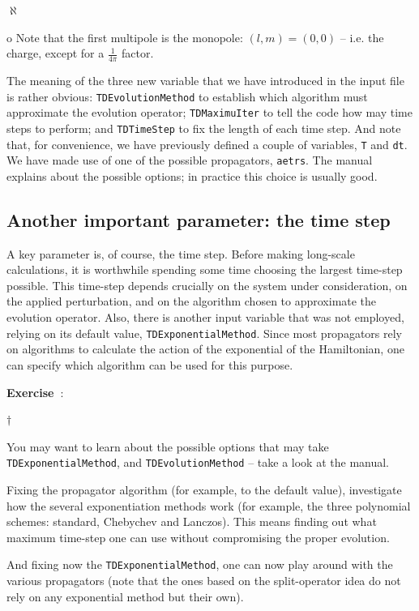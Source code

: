 \documentclass[10pt,a4paper,twoside]{article}
\newenvironment{mylist}
{
\begin{list}{$\aleph$}
{
\setlength{\parskip}{0pt}
\setlength{\topsep}{0pt}
\setlength{\partopsep}{0pt}
\setlength{\itemsep}{0pt}
\setlength{\parsep}{0pt}
}
}
{
\end{list}
}
\newcounter{exercises}
\newenvironment{exerciselist}
{
\refstepcounter{exercises}

{\bf Exercise~\arabic{exercises}}:
\begin{list}{$\dagger$}
{
\setlength{\parskip}{0pt}
\setlength{\topsep}{0pt}
\setlength{\partopsep}{0pt}
\setlength{\itemsep}{0pt}
\setlength{\parsep}{0pt}
}
}
{
\end{list}
}
\begin{document}
\begin{mylist}
\begin{list}{o}
Note that the first multipole is the monopole: $(l,m)=(0,0)$ -- i.e. the charge, except
for a $\frac{1}{4\pi}$ factor.
\end{list}

\item The meaning of the three new variable that we have introduced
in the input file is rather obvious: {\tt TDEvolutionMethod} to establish which
algorithm must approximate the evolution operator; {\tt TDMaximuIter} to tell
the code how may time steps to perform; and {\tt TDTimeStep} to fix
the length of each time step. And note that, for convenience, we have previously
defined a couple of variables, {\tt T} and {\tt dt}. We have made use of one of
the possible propagators, {\tt aetrs}. The manual explains about the possible
options; in practice this choice is usually good.
\end{mylist}


\subsection{Another important parameter: the time step}


A key parameter is, of course, the time step. Before making long-scale calculations,
it is worthwhile spending some time choosing the largest time-step possible. This
time-step depends crucially on the system under consideration, on the applied perturbation,
and on the algorithm chosen to approximate the evolution operator. Also, there is
another input variable that was not employed, relying on its default value,
{\tt TDExponentialMethod}. Since most propagators rely on algorithms to calculate
the action of the exponential of the Hamiltonian, one can specify which algorithm
can be used for this purpose.
\begin{exerciselist}
\item You may want to learn about the possible options that may take {\tt TDExponentialMethod},
and {\tt TDEvolutionMethod} -- take a look at the manual.
\item Fixing the propagator algorithm (for example, to the default value), 
investigate how the several exponentiation methods work (for example, the three
polynomial schemes: standard, Chebychev and Lanczos). This means finding out what
maximum time-step one can use without compromising the proper evolution.
\item And fixing now the {\tt TDExponentialMethod}, one can now play around with
the various propagators (note that the ones based on the split-operator idea do not
rely on any exponential method but their own).
\end{exerciselist}
\end{document}
